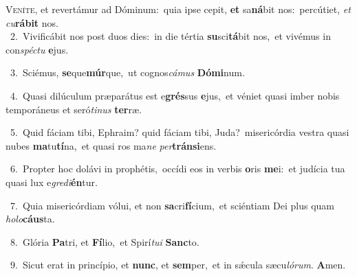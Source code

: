 \lettrine{\initial\textcolor{\initialcolor}{V}}{eníte,} et revertámur ad Dóminum:~\dagger quia ipse cepit, \textbf{et} sa\-\textbf{ná}\-bit nos:~\star percútiet, \textit{et} \textit{cu}\-\textbf{rá}\textbf{bit} nos.\\
{\numbfont\textcolor{\numbcolor}{~2.}}~Vivificábit nos post duos dies:~\dagger in die tértia \textbf{su}\-sci\-\textbf{tá}\-bit nos,~\star et vivémus in con\-\textit{spéc}\-\textit{tu} \textbf{e}\-jus.\par
{\numbfont\textcolor{\numbcolor}{~3.}}~Sciémus, \textbf{se}\-que\-\textbf{múr}\-que,~\star ut cognos\-\textit{cá}\-\textit{mus} \textbf{Dó}\-\textbf{mi}num.\par
{\numbfont\textcolor{\numbcolor}{~4.}}~Quasi dilúculum præparátus est e\-\textbf{grés}\-sus \textbf{e}\-jus,~\star et véniet quasi imber nobis temporáneus et seró\-\textit{ti}\-\textit{nus} \textbf{ter}\-ræ.\par
{\numbfont\textcolor{\numbcolor}{~5.}}~Quid fáciam tibi, Ephraim? quid fáciam tibi, Juda?~\dagger misericórdia vestra quasi nubes \textbf{ma}\-tu\-\textbf{tí}\-na,~\star et quasi ros ma\textit{ne} \textit{per}\-\textbf{tráns}\textbf{i}ens.\par
{\numbfont\textcolor{\numbcolor}{~6.}}~Propter hoc dolávi in prophétis,~\dagger occídi eos in verbis \textbf{o}\-ris \textbf{me}\-i:~\star et judícia tua quasi lux e\-\textit{gre}\-\textit{di}\textbf{én}tur.\par
{\numbfont\textcolor{\numbcolor}{~7.}}~Quia misericórdiam vólui, et non \textbf{sa}\-cri\-\textbf{fí}\-cium,~\star et sciéntiam Dei plus quam \textit{ho}\-\textit{lo}\textbf{cáus}ta.\par
{\numbfont\textcolor{\numbcolor}{~8.}}~Glória \textbf{Pa}\-tri, et \textbf{Fí}\-lio,~\star et Spirí\-\textit{tu}\-\textit{i} \textbf{Sanc}\-to.\par
{\numbfont\textcolor{\numbcolor}{~9.}}~Sicut erat in princípio, et \textbf{nunc}\-, et \textbf{sem}\-per,~\star et in sǽcula sæcu\-\textit{ló}\-\textit{rum}. \textbf{A}\-men.\par
